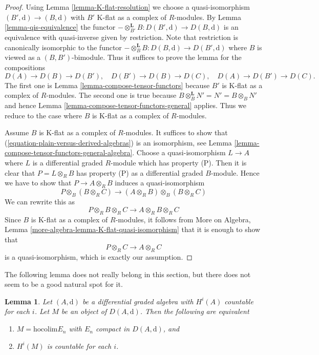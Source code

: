 \documentclass{stacks-project}
\theoremstyle{plain}
\newtheorem{lemma}[subsection]{Lemma}
\theoremstyle{definition}
\theoremstyle{remark}
\numberwithin{equation}{subsection}
\begin{document}
\begin{proof}
Using Lemma \ref{lemma-K-flat-resolution}
we choose a quasi-isomorphism $(B', \text{d}) \to (B, \text{d})$
with $B'$ K-flat as a complex of $R$-modules.
By Lemma \ref{lemma-qis-equivalence}
the functor $-\otimes^\mathbf{L}_{B'} B : D(B', \text{d}) \to D(B, \text{d})$
is an equivalence with quasi-inverse given by restriction.
Note that restriction is canonically isomorphic to the functor
$- \otimes^\mathbf{L}_B B : D(B, \text{d}) \to D(B', \text{d})$
where $B$ is viewed as a $(B, B')$-bimodule.
Thus it suffices to prove the lemma for the compositions
$$
D(A) \to D(B) \to D(B'),\quad
D(B') \to D(B) \to D(C),\quad
D(A) \to D(B') \to D(C).
$$
The first one is Lemma \ref{lemma-compose-tensor-functors}
because $B'$ is K-flat as a complex of $R$-modules.
The second one is true because
$B \otimes_B^\mathbf{L} N' = N' = B \otimes_B N'$
and hence Lemma \ref{lemma-compose-tensor-functors-general} applies.
Thus we reduce to the case where $B$ is K-flat as a complex
of $R$-modules.

\medskip\noindent
Assume $B$ is K-flat as a complex of $R$-modules. It suffices to
show that (\ref{equation-plain-versus-derived-algebras}) is an
isomorphism, see
Lemma \ref{lemma-compose-tensor-functors-general-algebra}.
Choose a quasi-isomorphism $L \to A$ where $L$ is a differential
graded $R$-module which has property (P). Then it is clear that
$P = L \otimes_R B$ has property (P) as a differential graded $B$-module.
Hence we have to show that $P \to A \otimes_R B$
induces a quasi-isomorphism
$$
P \otimes_B (B \otimes_R C)
\longrightarrow
(A \otimes_R B) \otimes_B (B \otimes_R C)
$$
We can rewrite this as
$$
P \otimes_R B \otimes_R C \longrightarrow A \otimes_R B \otimes_R C
$$
Since $B$ is K-flat as a complex of $R$-modules, it
follows from
More on Algebra, Lemma \ref{more-algebra-lemma-K-flat-quasi-isomorphism}
that it is enough
to show that
$$
P \otimes_R C \to A \otimes_R C
$$
is a quasi-isomorphism, which is exactly our assumption.
\end{proof}

\noindent
The following lemma does not really belong in this section, but there
does not seem to be a good natural spot for it.

\begin{lemma}
\label{lemma-countable}
Let $(A, \text{d})$ be a differential graded algebra with
$H^i(A)$ countable for each $i$. Let $M$ be an object of $D(A, \text{d})$.
Then the following are equivalent
\begin{enumerate}
\item $M = \text{hocolim} E_n$ with $E_n$ compact in $D(A, \text{d})$, and
\item $H^i(M)$ is countable for each $i$.
\end{enumerate}
\end{lemma}
\end{document}
